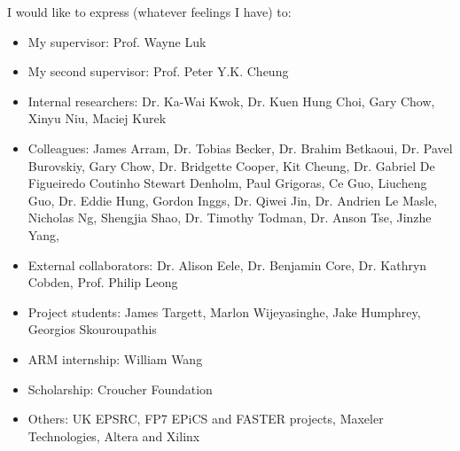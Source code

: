 
\cleardoublepage


\begin{acknowledgements}

I would like to express (whatever feelings I have) to:

\begin{itemize}
 \item My supervisor: Prof. Wayne Luk
 \vspace*{3mm}
 \item My second supervisor: Prof. Peter Y.K. Cheung 
 \vspace*{3mm}
 \item Internal researchers: Dr. Ka-Wai Kwok, Dr. Kuen Hung Choi, Gary Chow, Xinyu Niu, Maciej Kurek
 \vspace*{3mm}
 \item Colleagues: 
 James Arram, 
 Dr. Tobias Becker, 
 Dr. Brahim Betkaoui, 
 Dr. Pavel Burovskiy, 
 Gary Chow, 
 Dr. Bridgette Cooper, 
 Kit Cheung, 
 Dr. Gabriel De Figueiredo Coutinho
 Stewart Denholm, 
 Paul Grigoras, 
 Ce Guo, 
 Liucheng Guo, 
 Dr. Eddie Hung, 
 Gordon Inggs, 
 Dr. Qiwei Jin, 
 Dr. Andrien Le Masle, 
 Nicholas Ng, 
 Shengjia Shao, 
 Dr. Timothy Todman, 
 Dr. Anson Tse, 
 Jinzhe Yang, 
 \vspace*{3mm}
 \item External collaborators: Dr. Alison Eele, Dr. Benjamin Core, Dr. Kathryn Cobden, Prof. Philip Leong
 \vspace*{3mm}
 \item Project students: James Targett, Marlon Wijeyasinghe, Jake Humphrey, Georgios Skouroupathis
 \vspace*{3mm}
 \item ARM internship: William Wang
 \vspace*{3mm}
 \vspace*{3mm}
 \item Scholarship: Croucher Foundation
 \vspace*{3mm}
 \item Others: UK EPSRC, FP7 EPiCS and FASTER projects, Maxeler Technologies, Altera and Xilinx
\end{itemize}

\end{acknowledgements}
